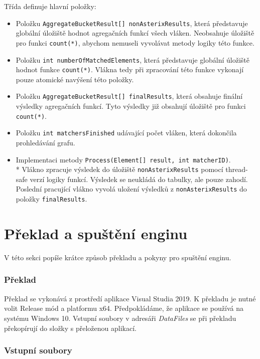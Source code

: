 Třída definuje hlavní položky:
\begin{itemize}
\item Položku \texttt{AggregateBucketResult[] nonAsterixResults}, která představuje globální úložiště hodnot agregačních funkcí všech vláken.
Neobsahuje úložiště pro funkci \texttt{count(*)}, abychom nemuseli vyvolávat metody logiky této funkce.
\item Položku \texttt{int numberOfMatchedElements}, která představuje globální úložiště hodnot funkce \texttt{count(*)}.
Vlákna tedy při zpracování této funkce vykonají pouze atomické navýšení této položky.
\item Položku \texttt{AggregateBucketResult[] finalResults}, která obsahuje finální výsledky agregačních funkcí.
Tyto výsledky již obsahují úložiště pro funkci \texttt{count(*)}.
\item Položku \texttt{int matchersFinished} udávající počet vláken, která dokončila prohledávání grafu.
\item Implementaci metody \texttt{Process(Element[] result, int matcherID)}.\\*
Vlákno zpracuje výsledek do úložiště \texttt{nonAsterixResults} pomocí thread-safe verzí logiky funkcí.
Výsledek se neukládá do tabulky, ale pouze zahodí.
Poslední pracující vlákno vyvolá uložení výsledků z \texttt{nonAsterixResults} do položky \texttt{finalResults}.
\end{itemize}

\section{Překlad a spuštění enginu}

V této sekci popíše krátce způsob překladu a pokyny pro spuštění enginu.

\subsubsection{Překlad}

Překlad se vykonává z prostředí aplikace Visual Studia 2019.
K překladu je nutné volit Release mód a platformu x64.
Předpokládáme, že aplikace se používá na systému Windows 10.
Vstupní soubory v adresáři \textit{DataFiles} se při překladu překopírují do složky s přeloženou aplikací.

\subsubsection{Vstupní soubory}

